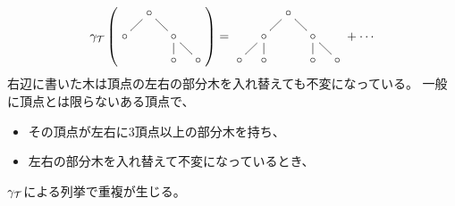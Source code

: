 {\begin{equation*}
\begin{split}
		\gamma_\T\left(\vcenter{\xymatrix@R=2ex@C=2ex{
			& \circ \ar@{-}[dl] \ar@{-}[dr] \\
			\circ & & \circ \ar@{-}[d] \ar@{-}[dr] \\
			& & \circ & \circ \\
		}}\right) &= \vcenter{\xymatrix@R=2ex@C=2ex{
			& & \circ \ar@{-}[dl] \ar@{-}[dr] \\
			& \circ \ar@{-}[dl] \ar@{-}[d] & & \circ \ar@{-}[d] \ar@{-}[dr] \\
			\circ & \circ & & \circ & \circ \\
		}} + \cdots \\
	\end{split}\end{equation*}
	右辺に書いた木は頂点の左右の部分木を入れ替えても不変になっている。
	一般に頂点とは限らないある頂点で、
	\begin{itemize}\setlength{\itemsep}{-1mm} %
		\item その頂点が左右に$3$頂点以上の部分木を持ち、
		\item 左右の部分木を入れ替えて不変になっているとき、
	\end{itemize} %
	$\gamma_{{\mathcal{T}}}$による列挙で重複が生じる。

}
